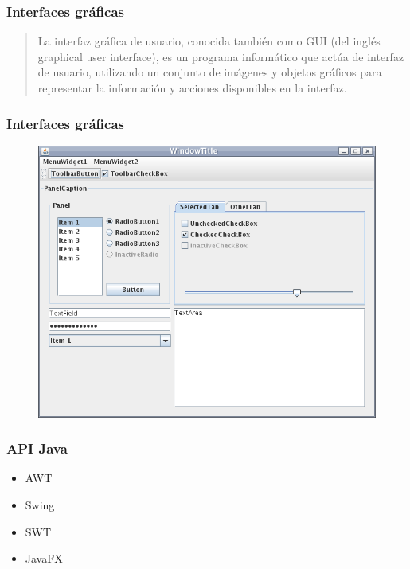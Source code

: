 \documentclass{beamer}
\begin{document}
\begin{frame}
\frametitle{Interfaces gráficas}
\begin{quote}
La interfaz gráfica de usuario, conocida también como GUI (del inglés graphical user interface), es un programa informático que actúa de interfaz de usuario, utilizando un conjunto de imágenes y objetos gráficos para representar la información y acciones disponibles en la interfaz. 
\end{quote}


\end{frame}
\begin{frame}
\frametitle{Interfaces gráficas}
\begin{figure}
\includegraphics[scale=0.4]{imagenes/gui1.png}
\end{figure}
\end{frame}

\begin{frame}
\frametitle{API Java}
\begin{itemize}[<+->]
\item AWT
\item Swing
\item SWT
\item JavaFX
\end{itemize}
\end{frame}
\end{document}
